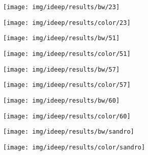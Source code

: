 \begin{figure}[!ht]
	\centering
	\begin{subfigure}{.4\textwidth}
		\centering
		\texttt{[image: img/ideep/results/bw/23]}
	\end{subfigure}
    \begin{subfigure}{.4\textwidth}
		\centering
		\texttt{[image: img/ideep/results/color/23]}
    \end{subfigure}
\end{figure}
\begin{figure}[!ht]
	\centering
	\begin{subfigure}{.4\textwidth}
		\centering
		\texttt{[image: img/ideep/results/bw/51]}
	\end{subfigure}
    \begin{subfigure}{.4\textwidth}
		\centering
		\texttt{[image: img/ideep/results/color/51]}
    \end{subfigure}
\end{figure}
\begin{figure}[!ht]
	\centering
	\begin{subfigure}{.4\textwidth}
		\centering
		\texttt{[image: img/ideep/results/bw/57]}
	\end{subfigure}
    \begin{subfigure}{.4\textwidth}
		\centering
		\texttt{[image: img/ideep/results/color/57]}
    \end{subfigure}
\end{figure}
\begin{figure}[!ht]
	\centering
	\begin{subfigure}{.4\textwidth}
		\centering
		\texttt{[image: img/ideep/results/bw/60]}
	\end{subfigure}
    \begin{subfigure}{.4\textwidth}
		\centering
		\texttt{[image: img/ideep/results/color/60]}
    \end{subfigure}
\end{figure}
\begin{figure}[!ht]
	\centering
	\begin{subfigure}{.4\textwidth}
		\centering
		\texttt{[image: img/ideep/results/bw/sandro]}
	\end{subfigure}
    \begin{subfigure}{.4\textwidth}
		\centering
		\texttt{[image: img/ideep/results/color/sandro]}
    \end{subfigure}
\end{figure}

